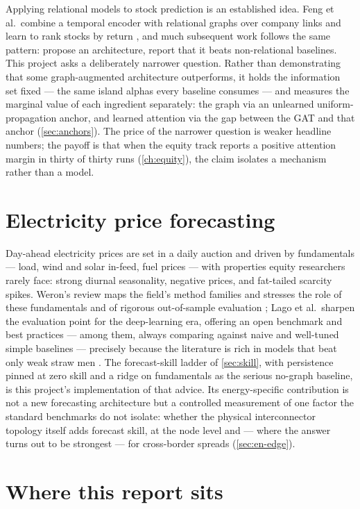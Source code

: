 Applying relational models to stock prediction is an established idea.
Feng et al.\ combine a temporal encoder with relational graphs over
company links and learn to rank stocks by return
\cite{feng2019stockranking}, and much subsequent work follows the same
pattern: propose an architecture, report that it beats non-relational
baselines. This project asks a deliberately narrower question. Rather
than demonstrating that some graph-augmented architecture outperforms,
it holds the information set fixed --- the same island alphas every
baseline consumes --- and measures the marginal value of each
ingredient separately: the graph via an unlearned uniform-propagation
anchor, and learned attention via the gap between the GAT and that
anchor (\cref{sec:anchors}). The price of the narrower question is
weaker headline numbers; the payoff is that when the equity track
reports a positive attention margin in thirty of thirty runs
(\cref{ch:equity}), the claim isolates a mechanism rather than a
model.

\section{Electricity price forecasting}
\label{sec:bg-epf}

Day-ahead electricity prices are set in a daily auction and driven by
fundamentals --- load, wind and solar in-feed, fuel prices --- with
properties equity researchers rarely face: strong diurnal seasonality,
negative prices, and fat-tailed scarcity spikes. Weron's review maps the
field's method families and stresses the role of these fundamentals and
of rigorous out-of-sample evaluation \cite{weron2014epf}; Lago et al.\
sharpen the evaluation point for the deep-learning era, offering an
open benchmark and best practices --- among them, always comparing
against naive and well-tuned simple baselines --- precisely because the
literature is rich in models that beat only weak straw men
\cite{lago2021epf}. The forecast-skill ladder of \cref{sec:skill}, with
persistence pinned at zero skill and a ridge on fundamentals as the
serious no-graph baseline, is this project's implementation of that
advice. Its energy-specific contribution is not a new forecasting
architecture but a controlled measurement of one factor the standard
benchmarks do not isolate: whether the physical interconnector topology
itself adds forecast skill, at the node level and --- where the answer
turns out to be strongest --- for cross-border spreads
(\cref{sec:en-edge}).

\section{Where this report sits}
\label{sec:bg-position}

